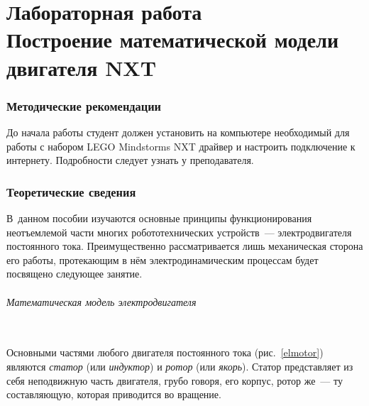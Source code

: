 \documentclass[12pt,a4paper,openany]{extarticle}
\begin{document}
\part*{Лабораторная работа \\
Построение математической модели двигателя NXT}

\section{Методические рекомендации}
\hspace*{\parindent}До начала работы студент должен установить на компьютере необходимый для работы с набором LEGO Mindstorms NXT драйвер и настроить подключение к интернету.
Подробности следует узнать у преподавателя. 

\section{Теоретические сведения}
\hspace*{\parindent}В~данном пособии изучаются основные принципы функционирования неотъемлемой части многих робототехнических устройств~--- электродвигателя постоянного тока.
Преимущественно рассматривается лишь механическая сторона его работы, протекающим в нём электродинамическим процессам будет посвящено следующее занятие. 

\paragraph*{Математическая модель электродвигателя}$\phantom{-}$\\
\hspace*{\parindent}Основными частями любого двигателя постоянного тока (рис.~\ref{elmotor}) являются {\itshape статор} (или \textit{индуктор})  и {\itshape ротор} (или \textit{якорь}).
Статор представляет из себя неподвижную часть двигателя, грубо говоря, его корпус,
ротор же~--- ту составляющую, которая приводится во вращение. 
\end{document}
